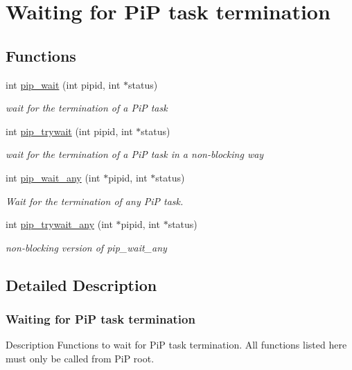\hypertarget{group__pip-3-wait}{\section{Waiting for Pi\-P task termination}
\label{group__pip-3-wait}
}
\subsection*{Functions}
\begin{DoxyCompactItemize}
\item 
int \hyperlink{group__pip-3-wait_gae04520bc29d3ec85d7090f7e645de27d}{pip\-\_\-wait} (int pipid, int $\ast$status)
\begin{DoxyCompactList}\small\item\em wait for the termination of a Pi\-P task \end{DoxyCompactList}\item 
int \hyperlink{group__pip-3-wait_ga9e786d15401af041842f3f503c962a4b}{pip\-\_\-trywait} (int pipid, int $\ast$status)
\begin{DoxyCompactList}\small\item\em wait for the termination of a Pi\-P task in a non-\/blocking way \end{DoxyCompactList}\item 
int \hyperlink{group__pip-3-wait_ga621bba73fda6b2bbe3c04e0c65006d36}{pip\-\_\-wait\-\_\-any} (int $\ast$pipid, int $\ast$status)
\begin{DoxyCompactList}\small\item\em Wait for the termination of any Pi\-P task. \end{DoxyCompactList}\item 
int \hyperlink{group__pip-3-wait_ga697a16f7400d2a2ed2b8ffa230ca83d9}{pip\-\_\-trywait\-\_\-any} (int $\ast$pipid, int $\ast$status)
\begin{DoxyCompactList}\small\item\em non-\/blocking version of {\ttfamily pip\-\_\-wait\-\_\-any} \end{DoxyCompactList}\end{DoxyCompactItemize}


\subsection{Detailed Description}
\hypertarget{pip-wait}{}\subsubsection{Waiting for Pi\-P task termination}\label{pip-wait}
\begin{DoxyParagraph}{Description}
Functions to wait for Pi\-P task termination. All functions listed here must only be called from Pi\-P root. 
\end{DoxyParagraph}


